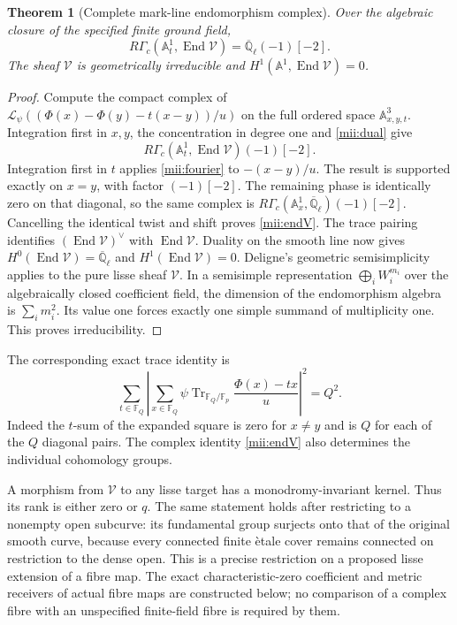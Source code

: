 \documentclass[11pt]{article}
\newtheorem{theorem}{Theorem}
\renewcommand{\AA}{\mathbb A}
\newcommand{\QQl}{\overline{\mathbb Q}_\ell}
\newcommand{\End}{\operatorname{End}}
\begin{document}
\begin{theorem}[Complete mark-line endomorphism complex]\label{mii:irreducible}
Over the algebraic closure of the specified finite ground field,
\begin{equation}\tag{MII6}\label{mii:endV}
 R\Gamma_c(\AA_t^1,\End\mathcal V)=\QQl(-1)[-2].
\end{equation}
The sheaf $\mathcal V$ is geometrically irreducible and
$H^1(\AA^1,\End\mathcal V)=0$.
\end{theorem}
\begin{proof}
Compute the compact complex of
$\mathcal L_\psi((\Phi(x)-\Phi(y)-t(x-y))/u)$ on the full ordered
space $\AA^3_{x,y,t}$. Integration first in $x,y$, the concentration in
degree one and \eqref{mii:dual} give
\[
 R\Gamma_c(\AA_t^1,\End\mathcal V)(-1)[-2].
\]
Integration first in $t$ applies \eqref{mii:fourier} to
$-(x-y)/u$. The result is supported exactly on $x=y$, with factor
$(-1)[-2]$. The remaining phase is identically zero on that diagonal, so
the same complex is
$R\Gamma_c(\AA_x^1,\QQl)(-1)[-2]$. Cancelling the identical twist and
shift proves \eqref{mii:endV}. The trace pairing identifies
$(\End\mathcal V)^\vee$ with $\End\mathcal V$. Duality on the smooth
line now gives $H^0(\End\mathcal V)=\QQl$ and $H^1(\End\mathcal V)=0$.
Deligne's geometric semisimplicity applies to the pure lisse sheaf
$\mathcal V$. In a semisimple representation $\bigoplus_i W_i^{m_i}$
over the algebraically closed coefficient field, the dimension of the
endomorphism algebra is $\sum_i m_i^2$. Its value one forces exactly one
simple summand of multiplicity one. This proves irreducibility.
\end{proof}

The corresponding exact trace identity is
\begin{equation}\tag{MII7}\label{mii:moment2}
 \sum_{t\in\mathbb F_Q}
 \left|\sum_{x\in\mathbb F_Q}
 \psi\operatorname{Tr}_{\mathbb F_Q/\mathbb F_p}
             \frac{\Phi(x)-tx}{u}\right|^2=Q^2.
\end{equation}
Indeed the $t$-sum of the expanded square is zero for $x\ne y$ and is
$Q$ for each of the $Q$ diagonal pairs. The complex identity
\eqref{mii:endV} also determines the individual cohomology groups.

A morphism from $\mathcal V$ to any lisse target has a
monodromy-invariant kernel. Thus its rank is either zero or $q$. The
same statement holds after restricting to a nonempty open subcurve: its
fundamental group surjects onto that of the original smooth curve, because
every connected finite \`etale cover remains connected on restriction to
the dense open. This is a precise restriction on a proposed lisse
extension of a fibre map. The exact characteristic-zero coefficient
and metric receivers of actual fibre maps are constructed below; no
comparison of a complex fibre with an unspecified finite-field fibre
is required by them.
\end{document}
